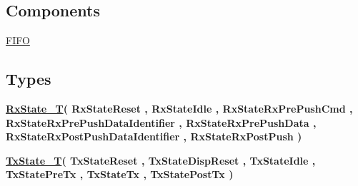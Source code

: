 \subsection*{Components}
 \begin{DoxyCompactItemize}
\item 
\mbox{\label{classLcdDriver_1_1LCD_a2055ffc86a781cfd9d1470f72494f04a}} 
\hyperlink{classLcdDriver_1_1LCD_a2055ffc86a781cfd9d1470f72494f04a}{F\+I\+FO}  {\bfseries }  
\end{DoxyCompactItemize}
\subsection*{Types}
 \begin{DoxyCompactItemize}
\item 
\mbox{\label{classLcdDriver_1_1LCD_a36ab1b4afe84944ea4c18e7a0e0b4cea}} 
{\bfseries \hyperlink{classLcdDriver_1_1LCD_a36ab1b4afe84944ea4c18e7a0e0b4cea}{Rx\+State\+\_\+T}{\bfseries \textcolor{vhdlchar}{(}\textcolor{vhdlchar}{ }\textcolor{vhdlchar}{Rx\+State\+Reset}\textcolor{vhdlchar}{ }\textcolor{vhdlchar}{,}\textcolor{vhdlchar}{ }\textcolor{vhdlchar}{Rx\+State\+Idle}\textcolor{vhdlchar}{ }\textcolor{vhdlchar}{,}\textcolor{vhdlchar}{ }\textcolor{vhdlchar}{Rx\+State\+Rx\+Pre\+Push\+Cmd}\textcolor{vhdlchar}{ }\textcolor{vhdlchar}{,}\textcolor{vhdlchar}{ }\textcolor{vhdlchar}{Rx\+State\+Rx\+Pre\+Push\+Data\+Identifier}\textcolor{vhdlchar}{ }\textcolor{vhdlchar}{,}\textcolor{vhdlchar}{ }\textcolor{vhdlchar}{Rx\+State\+Rx\+Pre\+Push\+Data}\textcolor{vhdlchar}{ }\textcolor{vhdlchar}{,}\textcolor{vhdlchar}{ }\textcolor{vhdlchar}{Rx\+State\+Rx\+Post\+Push\+Data\+Identifier}\textcolor{vhdlchar}{ }\textcolor{vhdlchar}{,}\textcolor{vhdlchar}{ }\textcolor{vhdlchar}{Rx\+State\+Rx\+Post\+Push}\textcolor{vhdlchar}{ }\textcolor{vhdlchar}{)}\textcolor{vhdlchar}{ }}} 
\item 
\mbox{\label{classLcdDriver_1_1LCD_a72cbc922b8204936ec69fa7acbbf5140}} 
{\bfseries \hyperlink{classLcdDriver_1_1LCD_a72cbc922b8204936ec69fa7acbbf5140}{Tx\+State\+\_\+T}{\bfseries \textcolor{vhdlchar}{(}\textcolor{vhdlchar}{ }\textcolor{vhdlchar}{Tx\+State\+Reset}\textcolor{vhdlchar}{ }\textcolor{vhdlchar}{,}\textcolor{vhdlchar}{ }\textcolor{vhdlchar}{Tx\+State\+Disp\+Reset}\textcolor{vhdlchar}{ }\textcolor{vhdlchar}{,}\textcolor{vhdlchar}{ }\textcolor{vhdlchar}{Tx\+State\+Idle}\textcolor{vhdlchar}{ }\textcolor{vhdlchar}{,}\textcolor{vhdlchar}{ }\textcolor{vhdlchar}{Tx\+State\+Pre\+Tx}\textcolor{vhdlchar}{ }\textcolor{vhdlchar}{,}\textcolor{vhdlchar}{ }\textcolor{vhdlchar}{Tx\+State\+Tx}\textcolor{vhdlchar}{ }\textcolor{vhdlchar}{,}\textcolor{vhdlchar}{ }\textcolor{vhdlchar}{Tx\+State\+Post\+Tx}\textcolor{vhdlchar}{ }\textcolor{vhdlchar}{)}\textcolor{vhdlchar}{ }}} 
\end{DoxyCompactItemize}
